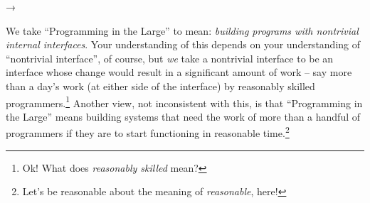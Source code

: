 \documentclass{ip3}
\begin{document}
→




\begin{foil}

\begin{note}
      We take ``Programming in the Large'' to mean: \textit{building
      programs with nontrivial internal interfaces}. Your understanding of
      this depends on your understanding of ``nontrivial interface'', of
      course, but \textit{we} take a nontrivial interface to be an
      interface whose change would result in a significant amount of work
      -- say more than a day's work (at either side of the interface) by
      reasonably skilled programmers.\footnote{Ok! What does
      \textit{reasonably skilled} mean?} Another view, not inconsistent
      with this, is that ``Programming in the Large'' means building
      systems that need the work of more than a handful of programmers if
      they are to start functioning in reasonable time.\footnote{Let's be
      reasonable about the meaning of \textit{reasonable}, here!}

\end{note}


\end{foil}
\end{document}
